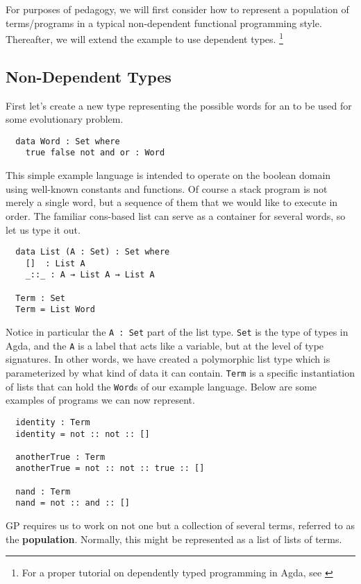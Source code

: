 \documentclass{acm_proc_article-sp}
\begin{document}
For purposes of pedagogy, we will first consider how to represent a
population of terms/programs in a typical non-dependent functional
programming style. Thereafter, we will extend the example to use
dependent types.
\footnote{For a proper tutorial on dependently typed programming in Agda, see \cite{norell:agdatut}}

\subsection{Non-Dependent Types}

First let's create a new type representing the possible words for an
to be used for some evolutionary problem.

\begin{verbatim}
  data Word : Set where
    true false not and or : Word
\end{verbatim}

This simple example language is intended to operate on the boolean domain using
well-known constants and functions. Of course a stack program is not
merely a single word, but a sequence of them that we would like to
execute in order. The familiar cons-based list can serve as a
container for several words, so let us type it out.

\begin{verbatim}
  data List (A : Set) : Set where
    []  : List A
    _::_ : A → List A → List A

  Term : Set
  Term = List Word
\end{verbatim}

Notice in particular the \texttt{A : Set} part of the list
type. \texttt{Set} is the type of types in Agda, and the \texttt{A} is
a label that acts like a variable, but at the level of type
signatures. In other words, we have created a polymorphic list type
which is parameterized by what kind of data it can
contain. \texttt{Term} is a specific instantiation of lists that can
hold the \texttt{Word}s of our example language. Below are some
examples of programs we can now represent.

\begin{verbatim}
  identity : Term
  identity = not :: not :: []

  anotherTrue : Term
  anotherTrue = not :: not :: true :: []

  nand : Term
  nand = not :: and :: []
\end{verbatim}

GP requires us to work on not one but a collection of several terms,
referred to as the \textbf{population}. Normally, this might be
represented as a list of lists of terms.
\end{document}
